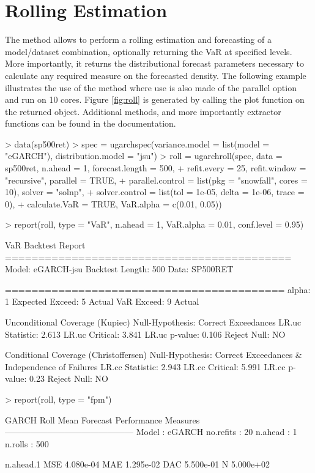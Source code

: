 \section{Rolling Estimation}\label{section:rolling}
The \verb@ugarchroll@ method allows to perform a rolling estimation and
forecasting of a model/dataset combination, optionally returning the VaR at
specified levels. More importantly, it returns the distributional forecast
parameters necessary to calculate any required measure on the forecasted density.
The following example illustrates the use of the method where use is also made
of the parallel option and run on 10 cores. Figure \ref{fig:roll} is generated
by calling the plot function on the returned \verb@uGARCHroll@ object.
Additional methods, and more importantly extractor functions can be found in the
documentation.
\begin{Schunk}
\begin{Sinput}
> data(sp500ret)
> spec = ugarchspec(variance.model = list(model = "eGARCH"), distribution.model = "jsu")
> roll = ugarchroll(spec, data = sp500ret, n.ahead = 1, forecast.length = 500,
+     refit.every = 25, refit.window = "recursive", parallel = TRUE,
+     parallel.control = list(pkg = "snowfall", cores = 10), solver = "solnp",
+     solver.control = list(tol = 1e-05, delta = 1e-06, trace = 0),
+     calculate.VaR = TRUE, VaR.alpha = c(0.01, 0.05))
\end{Sinput}
\begin{Sinput}
> report(roll, type = "VaR", n.ahead = 1, VaR.alpha = 0.01, conf.level = 0.95)
\end{Sinput}
\begin{Soutput}
VaR Backtest Report
===========================================
Model:                  eGARCH-jsu
Backtest Length:        500
Data:                   SP500RET

==========================================
alpha:                  1%
Expected Exceed:        5
Actual VaR Exceed:      9
Actual %

Unconditional Coverage (Kupiec)
Null-Hypothesis:        Correct Exceedances
LR.uc Statistic:        2.613
LR.uc Critical:         3.841
LR.uc p-value:          0.106
Reject Null:            NO

Conditional Coverage (Christoffersen)
Null-Hypothesis:        Correct Exceedances &
                        Independence of Failures
LR.cc Statistic:        2.943
LR.cc Critical:         5.991
LR.cc p-value:          0.23
Reject Null:            NO
\end{Soutput}
\begin{Sinput}
> report(roll, type = "fpm")
\end{Sinput}
\begin{Soutput}
GARCH Roll Mean Forecast Performance Measures
---------------------------------------------
Model : eGARCH
no.refits : 20
n.ahead   : 1
n.rolls   : 500

    n.ahead.1
MSE 4.080e-04
MAE 1.295e-02
DAC 5.500e-01
N   5.000e+02
\end{Soutput}
\end{Schunk}
